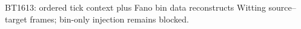 \begin{center}\small
BT1613: ordered tick context plus Fano bin data reconstructs Witting source--target frames; bin-only injection remains blocked.
\end{center}
